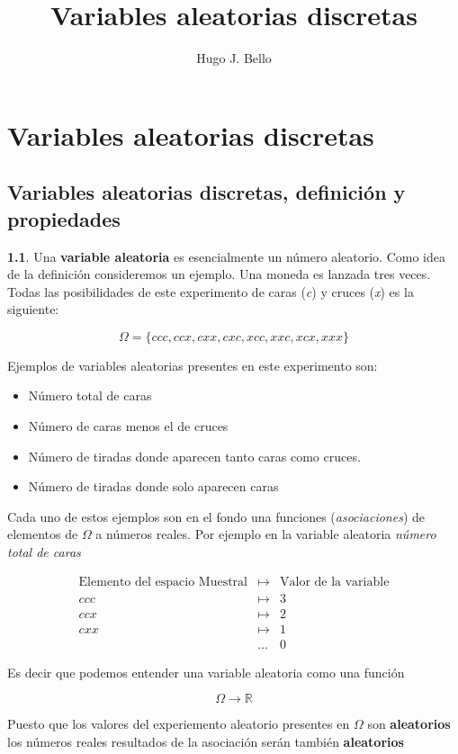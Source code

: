 \documentclass[]{book}
\title{Variables aleatorias discretas}
\author{Hugo J. Bello}
\date{}
\providecommand{\tightlist}{%
  \setlength{\itemsep}{0pt}\setlength{\parskip}{0pt}}
\theoremstyle{plain}
\theoremstyle{definition}
\theoremstyle{definition} %
\newcommand{\thistheoremname}{}
\newtheorem{genericthm}[theorem]{\thistheoremname}
\newenvironment{customdef}[1]
  {\renewcommand{\thistheoremname}{#1}%
   \begin{genericthm}}
  {\end{genericthm}}
\begin{document}
\chapter{Variables aleatorias discretas}


\section{Variables aleatorias discretas, definición y
propiedades}

\begin{customdef}{Definición intuitiva de variable aleatoria}
  
Una \textbf{variable aleatoria} es esencialmente un número aleatorio.
Como idea de la definición consideremos un ejemplo. Una moneda es
lanzada tres veces. Todas las posibilidades de este experimento de caras
(\emph{c}) y cruces (\emph{x}) es la siguiente:

\[\Omega = \{ccc, ccx, cxx, cxc, xcc, xxc, xcx, xxx\}\]

Ejemplos de variables aleatorias presentes en este experimento son:

\begin{itemize}
\tightlist
\item
  Número total de caras
\item
  Número de caras menos el de cruces
\item
  Número de tiradas donde aparecen tanto caras como cruces.
\item
  Número de tiradas donde solo aparecen caras
\end{itemize}

Cada uno de estos ejemplos son en el fondo una funciones
(\emph{asociaciones}) de elementos de \(\Omega\) a números reales. Por
ejemplo en la variable aleatoria \emph{número total de caras}

\begin{align*}
\text{Elemento del espacio Muestral} & \longmapsto & \text{Valor de la variable}\\
ccc & \longmapsto & 3\\
ccx & \longmapsto & 2\\
cxx & \longmapsto & 1\\
    & \ldots &0
\end{align*}

Es decir que podemos entender una variable aleatoria como una función

\[ \Omega \to \mathbb{R}\]

Puesto que los valores del experiemento aleatorio presentes en
\(\Omega\) son \textbf{aleatorios} los números reales resultados de la
asociación serán también \textbf{aleatorios}


\end{customdef}
\end{document}
